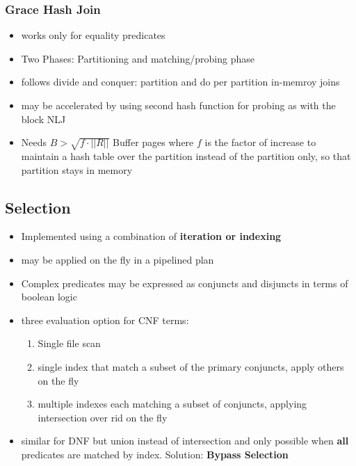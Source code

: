  \subsubsection{Grace Hash Join}
 \begin{itemize}
     \item works only for equality predicates
     \item Two Phases: Partitioning and matching/probing phase 
     \item follows divide and conquer: partition and do per partition in-memroy joins
     \item may be accelerated by using second hash function for probing as with the block NLJ
     \item Needs $B > \sqrt{f \cdot ||R||}$ Buffer pages where $f$ is the factor of increase to maintain a hash table over the partition instead of the partition only, so that partition stays in memory
 \end{itemize}
 
 \subsection{Selection}
 \begin{itemize}
     \item Implemented using  a combination of \textbf{iteration or indexing}
     \item may be applied on the fly in a pipelined plan
     \item Complex predicates may be expressed as conjuncts and disjuncts in terms of boolean logic
     \item three evaluation option for CNF terms:
     \begin{enumerate}
         \item Single file scan
         \item single index that match a subset of the primary conjuncts, apply others on the fly 
         \item multiple indexes each matching a subset of conjuncts, applying intersection over rid on the fly
     \end{enumerate}
     \item similar for DNF but union instead of intersection and only possible when \textbf{all} predicates are matched by index. Solution: \textbf{Bypass Selection}
 \end{itemize}
 
